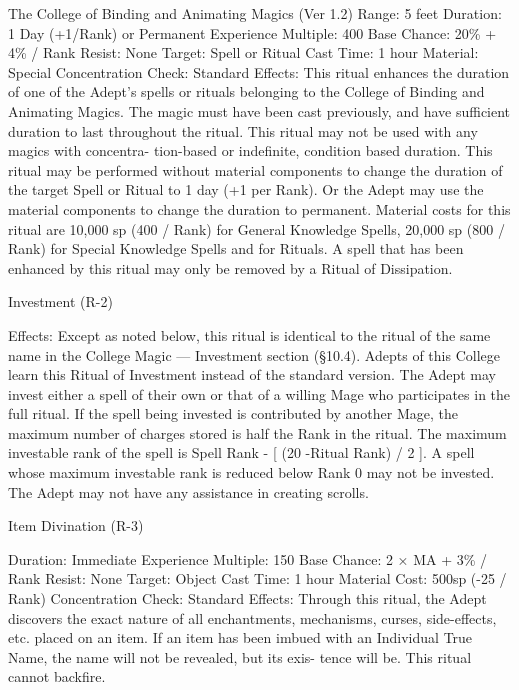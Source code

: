 \begin{Chapter}{The College of Binding and Animating Magics (Ver 1.2)}
Range: 5 feet 
Duration: 1 Day (+1/Rank) or Permanent 
Experience Multiple: 400 
Base Chance: 20\% + 4\% / Rank 
Resist: None 
Target: Spell or Ritual 
Cast Time: 1 hour 
Material: Special 
Concentration Check: Standard 
Effects: This ritual enhances the duration of one of 
the  Adept’s  spells  or  rituals  belonging  to  the  College of Binding and Animating Magics. The magic 
must have been cast previously, and have sufficient 
duration  to  last  throughout  the  ritual.  This  ritual 
may  not  be  used  with  any  magics  with  concentra-
tion-based  or  indefinite,  condition  based  duration. 
This  ritual  may  be  performed  without  material 
components  to  change  the  duration  of  the  target 
Spell  or  Ritual  to  1  day  (+1  per  Rank).  Or  the 
Adept may use the material components to change 
the  duration  to  permanent.  Material  costs  for  this 
ritual  are  10,000  sp  (400  /  Rank)  for  General 
Knowledge  Spells,  20,000  sp  (800  /  Rank)  for 
Special  Knowledge  Spells  and  for  Rituals.  A  spell 
that  has  been  enhanced  by  this  ritual  may  only  be 
removed by a Ritual of Dissipation. 

Investment (R-2) 

Effects: Except as noted below, this ritual is identical  to  the  ritual  of  the  same  name  in  the  College 
Magic  —  Investment  section  (§10.4).  Adepts  of 
this College learn this Ritual of Investment instead 
of  the  standard  version.  The  Adept  may  invest 
either a spell of their own or that of a willing Mage 
who participates in the full ritual. If the spell being 
invested  is  contributed  by  another  Mage,  the 
maximum  number  of  charges  stored  is  half  the 
Rank  in  the  ritual.  The  maximum  investable  rank 
of the spell is Spell Rank - [ (20 -Ritual Rank) / 2 ]. 
A spell whose maximum investable rank is reduced 
below Rank 0 may not be invested. The Adept may 
not have any assistance in creating scrolls. 

Item Divination (R-3) 

Duration: Immediate 
Experience Multiple: 150 
Base Chance: 2 × MA + 3\% / Rank 
Resist: None 
Target: Object 
Cast Time: 1 hour 
Material Cost: 500sp (-25 / Rank) 
Concentration Check: Standard 
Effects:  Through  this  ritual,  the  Adept  discovers 
the  exact nature  of  all  enchantments,  mechanisms, 
curses,  side-effects,  etc.  placed  on  an  item.  If  an 
item  has  been  imbued  with  an  Individual  True 
Name,  the  name  will  not be  revealed,  but  its  exis-
tence will be. This ritual cannot backfire. 


\end{Chapter}
